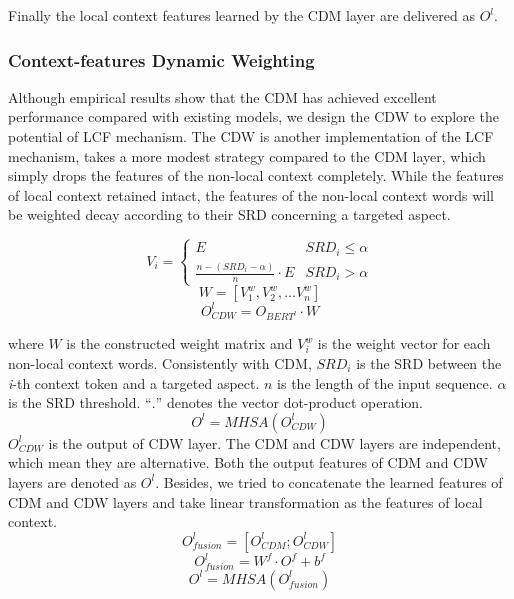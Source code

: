 \documentclass[a4paper,fleqn]{cas-sc}
\begin{document}
Finally the local context features learned by the CDM layer are delivered as $O^{l}$.

\subsubsection{Context-features Dynamic Weighting}

Although empirical results show that the CDM has achieved excellent performance compared with existing models, we design the CDW to explore the potential of LCF mechanism. The CDW is another implementation of the LCF mechanism, takes a more modest strategy compared to the CDM layer, which simply drops the features of the non-local context completely. 
While the features of local context retained intact, the features of the non-local context words will be weighted decay according to their SRD concerning a targeted aspect.

\begin{equation}
V_{i}=\left\{\begin{array}{cc}{E} & { S R D_{i} \leq \alpha} \\ {\frac{n -( SRD_{i}-\alpha)}{n} \cdot E} & {S R D_{i}>\alpha}\end{array}\right.
\end{equation}
\begin{equation}
W=\left[V_{1}^{w}, V_{2}^{w}, \ldots V_{n}^{w}\right]
\end{equation}
\begin{equation}
O_{C D W}^{l}=O_{BERT^l} \cdot W
\end{equation}


where $W$ is the constructed weight matrix and $V_{i}^{w}$ is the weight vector for each non-local context words. Consistently with CDM, $SRD_{i}$ is the SRD between the \textit{i}-th context token and a targeted aspect. $n$ is the length of the input sequence. $\alpha$ is the SRD threshold. ``$.$'' denotes the vector dot-product operation.
\begin{equation}
O^{l}=M H S A\left(O_{C D W}^{l}\right)
\end{equation}
$O_{C D W}^{l}$ is the output of CDW layer. The CDM and CDW layers are independent, which mean they are alternative. Both the output features of CDM and CDW layers are denoted as $O^{l}$. Besides, we tried to concatenate the learned features of CDM and CDW layers and take linear transformation as the features of local context.
\begin{equation}
O_{fusion}^l=[O_{C D M}^{l};O_{C D W}^{l}]
\end{equation}
\begin{equation}
O_{fusion}^{l} = W^{f} \cdot O^{f} + b^{f}
\end{equation}
\begin{equation}
O^{l}=M H S A\left(O_{fusion}^l\right)
\end{equation}
\end{document}
